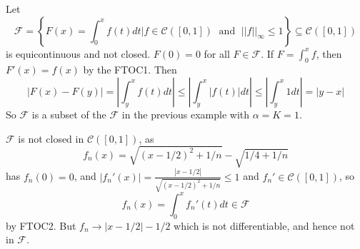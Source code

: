 \begin{eg}
    Let $$\mathcal{F} = \left\{F(x) = \int_0^xf(t)dt\vert f \in \mathcal{C}([0,1])\;\text{ and }\;||f||_{\infty} \leq 1\right\} \subseteq \mathcal{C}([0,1])$$ is equicontinuous and not closed. $F(0) = 0$ for all $F \in \mathcal{F}$. If $F = \int_0^xf$, then $F'(x) = f(x)$ by the FTOC1. Then $$|F(x) - F(y)| = \left|\int_y^xf(t)dt\right| \leq \left|\int_y^x|f(t)|dt\right| \leq \left|\int_y^x1dt\right| = |y-x|$$ So $\mathcal{F}$ is a subset of the $\mathcal{F}$ in the previous example with $\alpha = K = 1$.

    $\mathcal{F}$ is not closed in $\mathcal{C}([0,1])$, as $$f_n(x) = \sqrt{(x-1/2)^2+1/n} - \sqrt{1/4+1/n}$$ has $f_n(0) = 0$, and $|f_n'(x)| = \frac{|x-1/2|}{\sqrt{(x-1/2)^2+1/n}} \leq 1$ and $f_n' \in \mathcal{C}([0,1])$, so $$f_n(x) = \int_0^xf_n'(t)dt \in \mathcal{F}$$ by FTOC2. But $f_n \rightarrow |x-1/2| - 1/2$ which is not differentiable, and hence not in $\mathcal{F}$.
\end{eg}

